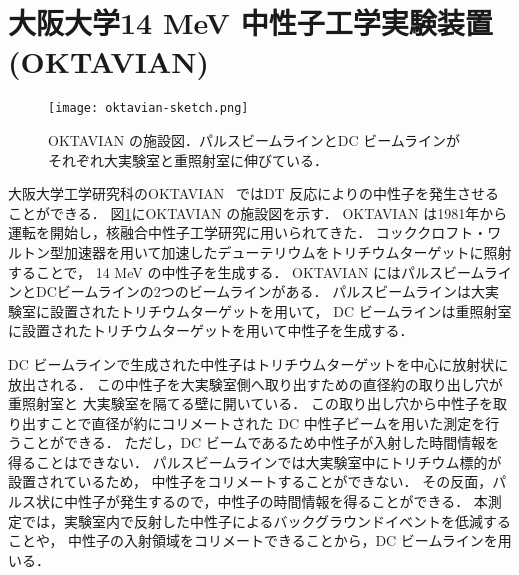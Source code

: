 \documentclass[../master]{subfiles}
\begin{document}
\section{大阪大学14 MeV 中性子工学実験装置 (OKTAVIAN)}
\begin{figure}
  \centering
  \texttt{[image: oktavian-sketch.png]}
  \caption[OKTAVIAN の施設図．]
          {OKTAVIAN の施設図．パルスビームラインとDC ビームラインがそれぞれ大実験室と重照射室に伸びている．}
  \label{pic::oktavian-sketch}
\end{figure}
大阪大学工学研究科のOKTAVIAN~\cite{oktavian} ではDT 反応によりの中性子を発生させることができる．
図\ref{pic::oktavian-sketch}にOKTAVIAN の施設図を示す．
OKTAVIAN は1981年から運転を開始し，核融合中性子工学研究に用いられてきた．
コッククロフト・ワルトン型加速器を用いて加速したデューテリウムをトリチウムターゲットに照射することで，
14 MeV の中性子を生成する．
OKTAVIAN にはパルスビームラインとDCビームラインの2つのビームラインがある．
パルスビームラインは大実験室に設置されたトリチウムターゲットを用いて，
DC ビームラインは重照射室に設置されたトリチウムターゲットを用いて中性子を生成する．

DC ビームラインで生成された中性子はトリチウムターゲットを中心に放射状に放出される．
この中性子を大実験室側へ取り出すための直径約の取り出し穴が重照射室と
大実験室を隔てる壁に開いている．
この取り出し穴から中性子を取り出すことで直径が約にコリメートされた
DC 中性子ビームを用いた測定を行うことができる．
ただし，DC ビームであるため中性子が入射した時間情報を得ることはできない．
パルスビームラインでは大実験室中にトリチウム標的が設置されているため，
中性子をコリメートすることができない．
その反面，パルス状に中性子が発生するので，中性子の時間情報を得ることができる．
本測定では，実験室内で反射した中性子によるバックグラウンドイベントを低減することや，
中性子の入射領域をコリメートできることから，DC ビームラインを用いる．
\end{document}
